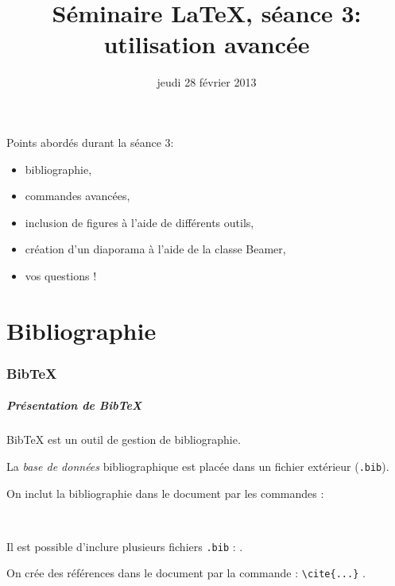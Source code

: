 \documentclass{beamer}
\title [Séminaire \LaTeX, séance 3]{Séminaire \LaTeX, séance 3: utilisation avancée}
\date{jeudi 28 février 2013}
\begin{document}

\begin{frame}
    \titlepage
\end{frame}


\begin{frame}{Points abordés durant la séance 3:}
    \begin{itemize}
            \item bibliographie, 
            \item commandes avancées, 
            \item inclusion de figures à l'aide de différents outils, 
            \item création d'un diaporama à l'aide de la classe Beamer, 
            \item vos questions !
        \end{itemize}
\end{frame}


\part{Bibliographie}


\section{BibTeX}


\begin{frame}[fragile]
\frametitle{Présentation de BibTeX}
BibTeX est un outil de gestion de bibliographie.

\medskip
La \emph{base de données} bibliographique est placée dans un fichier extérieur (\lstinline?.bib?).

\medskip
On inclut la bibliographie dans le document par les commandes :
\begin{lstlisting}


\end{lstlisting}
Il est possible d'inclure plusieurs fichiers \lstinline?.bib? :
\lstinline??.

\medskip
On crée des références dans le document par la commande : \lstinline?\cite{...}?  \cite{latexcompanion}.
\end{frame}
\end{document}
